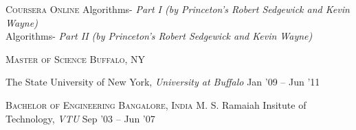 \documentclass[10pt,a4paper]{article} %
\begin{document}



\spacedhrule{0.5em}{-0.4em} %

\headedsection %
{\textsc{Coursera}} {\textsc{Online}} {
  \headedsubsection %
  {Algorithms- \textit{Part I (by Princeton's Robert Sedgewick and Kevin Wayne)}}
  {} {
	\\
  }\vspace{-1.0em}
  \headedsubsection %
  {Algorithms- \textit{Part II (by Princeton's Robert Sedgewick and Kevin Wayne)}}
  {} {
  }
}

\headedsection %
{\textsc{Master of Science}}
{\textsc{Buffalo, NY}} {

  \headedsubsection %
	{The State University of New York, \textit{University at Buffalo}} 
	{Jan '09 -- Jun '11} {}
}


\headedsection %
{\textsc{Bachelor of Engineering}}
{\textsc{Bangalore, India}} {
  \headedsubsection %
  {M. S. Ramaiah Insitute of Technology, \textit{VTU}}
  {Sep '03 -- Jun '07} {}
}
\end{document}
